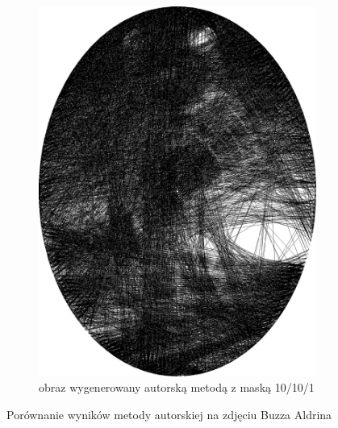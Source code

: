 \documentclass[a4paper, 12pt, polish, twoside]{extreport}
\begin{document}
\begin{figure}[H]
\begin{subfigure}{0.24\textwidth}
        \includegraphics[width = \textwidth]{img/6-comp/aldrin_e_i3500_c20_inv0_bg10_obj10_ed1.png}
        \caption{obraz wygenerowany autorską metodą z maską 10/10/1}
        \label{comp-comp-aldrin-h}
    \end{subfigure}
    \caption{Porównanie wyników metody autorskiej na zdjęciu Buzza Aldrina}
    \label{comp-comp-aldrin}
    \end{figure}
    
\end{document}
